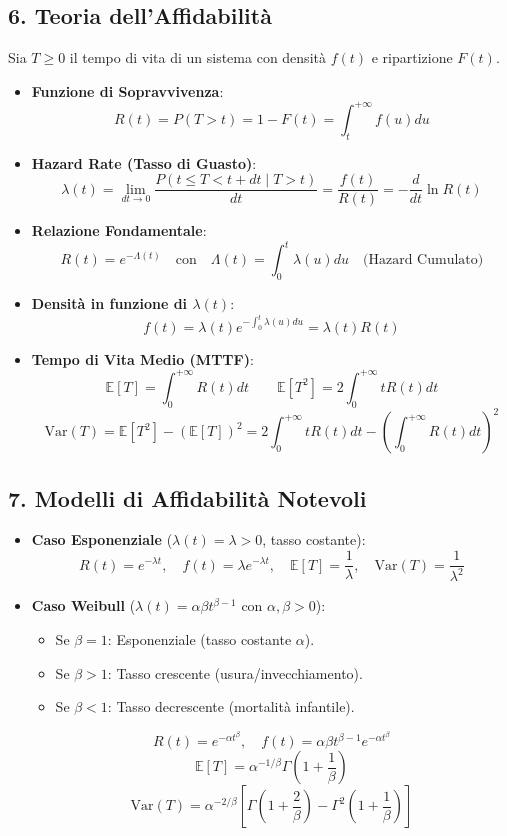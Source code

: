 {\color{navy}\subsection*{6. Teoria dell'Affidabilità}}
Sia $T \ge 0$ il tempo di vita di un sistema con densità $f(t)$ e ripartizione $F(t)$.
\begin{itemize}
    \item \textbf{Funzione di Sopravvivenza}:
    \[ R(t) = P(T > t) = 1 - F(t) = \int_t^{+\infty} f(u)du \]
    \item \textbf{Hazard Rate (Tasso di Guasto)}:
    \[ \lambda(t) = \lim_{dt \to 0} \frac{P(t \le T < t+dt \mid T > t)}{dt} = \frac{f(t)}{R(t)} = -\frac{d}{dt}\ln R(t) \]
    \item \textbf{Relazione Fondamentale}:
    \[ R(t) = e^{-\Lambda(t)} \quad \text{con} \quad \Lambda(t) = \int_0^t \lambda(u)du \quad \text{(Hazard Cumulato)} \]
    \item \textbf{Densità in funzione di $\lambda(t)$}:
    \[ f(t) = \lambda(t) e^{-\int_0^t \lambda(u)du} = \lambda(t) R(t) \]
    \item \textbf{Tempo di Vita Medio (MTTF)}:
    \[ \mathbb{E}[T] = \int_0^{+\infty} R(t)dt \qquad \mathbb{E}[T^2] = 2\int_0^{+\infty} t R(t)dt \]
    \[ \text{Var}(T) = \mathbb{E}[T^2] - (\mathbb{E}[T])^2 = 2\int_0^{+\infty} t R(t)dt - \left(\int_0^{+\infty} R(t)dt\right)^2 \]
\end{itemize}

{\color{navy}\subsection*{7. Modelli di Affidabilità Notevoli}}
\begin{itemize}
    \item \textbf{Caso Esponenziale} ($\lambda(t) = \lambda > 0$, tasso costante):
    \[ R(t) = e^{-\lambda t}, \quad f(t) = \lambda e^{-\lambda t}, \quad \mathbb{E}[T] = \frac{1}{\lambda}, \quad \text{Var}(T) = \frac{1}{\lambda^2} \]
    \item \textbf{Caso Weibull} ($\lambda(t) = \alpha \beta t^{\beta-1}$ con $\alpha, \beta > 0$):
    \begin{itemize}
        \item Se $\beta = 1$: Esponenziale (tasso costante $\alpha$).
        \item Se $\beta > 1$: Tasso crescente (usura/invecchiamento).
        \item Se $\beta < 1$: Tasso decrescente (mortalità infantile).
    \end{itemize}
    \[ R(t) = e^{-\alpha t^\beta}, \quad f(t) = \alpha \beta t^{\beta-1} e^{-\alpha t^\beta} \]
    \[ \mathbb{E}[T] = \alpha^{-1/\beta} \Gamma\left(1 + \frac{1}{\beta}\right) \]
    \[ \text{Var}(T) = \alpha^{-2/\beta} \left[ \Gamma\left(1 + \frac{2}{\beta}\right) - \Gamma^2\left(1 + \frac{1}{\beta}\right) \right] \]
\end{itemize}
